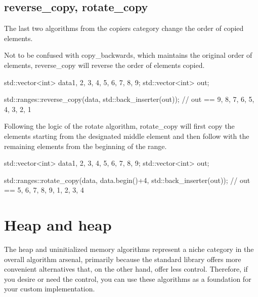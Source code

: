 \subsection{reverse\_copy, rotate\_copy}

The last two algorithms from the copiers category change the order of copied elements.



Not to be confused with copy\_backwards, which maintains the original order of elements, reverse\_copy will reverse the order of elements copied.

\begin{box-note}
\begin{cppcode}
std::vector<int> data{1, 2, 3, 4, 5, 6, 7, 8, 9};
std::vector<int> out;

std::ranges::reverse_copy(data, std::back_inserter(out));
// out == { 9, 8, 7, 6, 5, 4, 3, 2, 1 }
\end{cppcode}
\end{box-note}



Following the logic of the rotate algorithm, rotate\_copy will first copy the elements starting from the designated middle element and then follow with the remaining elements from the beginning of the range.

\begin{box-note}
\begin{cppcode}
std::vector<int> data{1, 2, 3, 4, 5, 6, 7, 8, 9};
std::vector<int> out;

std::ranges::rotate_copy(data, data.begin()+4, std::back_inserter(out));
// out == { 5, 6, 7, 8, 9, 1, 2, 3, 4 }
\end{cppcode}
\end{box-note}

\section{Heap and heap}

The heap and uninitialized memory algorithms represent a niche category in the overall algorithm arsenal, primarily because the standard library offers more convenient alternatives that, on the other hand, offer less control. Therefore, if you desire or need the control, you can use these algorithms as a foundation for your custom implementation.

